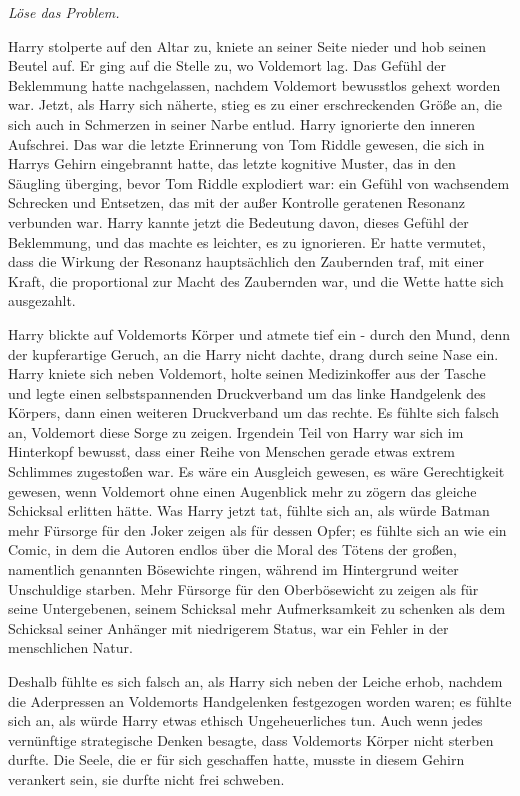 {\emph{Löse das Problem.}

Harry stolperte auf den Altar zu, kniete an seiner Seite nieder und hob seinen Beutel auf. Er ging auf die Stelle zu, wo Voldemort lag. Das Gefühl der Beklemmung hatte nachgelassen, nachdem Voldemort bewusstlos gehext worden war. Jetzt, als Harry sich näherte, stieg es zu einer erschreckenden Größe an, die sich auch in Schmerzen in seiner Narbe entlud. Harry ignorierte den inneren Aufschrei. Das war die letzte Erinnerung von Tom Riddle gewesen, die sich in Harrys Gehirn eingebrannt hatte, das letzte kognitive Muster, das in den Säugling überging, bevor Tom Riddle explodiert war: ein Gefühl von wachsendem Schrecken und Entsetzen, das mit der außer Kontrolle geratenen Resonanz verbunden war. Harry kannte jetzt die Bedeutung davon, dieses Gefühl der Beklemmung, und das machte es leichter, es zu ignorieren. Er hatte vermutet, dass die Wirkung der Resonanz hauptsächlich den Zaubernden traf, mit einer Kraft, die proportional zur Macht des Zaubernden war, und die Wette hatte sich ausgezahlt.

Harry blickte auf Voldemorts Körper und atmete tief ein - durch den Mund, denn der kupferartige Geruch, an die Harry nicht dachte, drang durch seine Nase ein. Harry kniete sich neben Voldemort, holte seinen Medizinkoffer aus der Tasche und legte einen selbstspannenden Druckverband um das linke Handgelenk des Körpers, dann einen weiteren Druckverband um das rechte. Es fühlte sich falsch an, Voldemort diese Sorge zu zeigen. Irgendein Teil von Harry war sich im Hinterkopf bewusst, dass einer Reihe von Menschen gerade etwas extrem Schlimmes zugestoßen war. Es wäre ein Ausgleich gewesen, es wäre Gerechtigkeit gewesen, wenn Voldemort ohne einen Augenblick mehr zu zögern das gleiche Schicksal erlitten hätte. Was Harry jetzt tat, fühlte sich an, als würde Batman mehr Fürsorge für den Joker zeigen als für dessen Opfer; es fühlte sich an wie ein Comic, in dem die Autoren endlos über die Moral des Tötens der großen, namentlich genannten Bösewichte ringen, während im Hintergrund weiter Unschuldige starben. Mehr Fürsorge für den Oberbösewicht zu zeigen als für seine Untergebenen, seinem Schicksal mehr Aufmerksamkeit zu schenken als dem Schicksal seiner Anhänger mit niedrigerem Status, war ein Fehler in der menschlichen Natur.

Deshalb fühlte es sich falsch an, als Harry sich neben der Leiche erhob, nachdem die Aderpressen an Voldemorts Handgelenken festgezogen worden waren; es fühlte sich an, als würde Harry etwas ethisch Ungeheuerliches tun. Auch wenn jedes vernünftige strategische Denken besagte, dass Voldemorts Körper nicht sterben durfte. Die Seele, die er für sich geschaffen hatte, musste in diesem Gehirn verankert sein, sie durfte nicht frei schweben.

}
